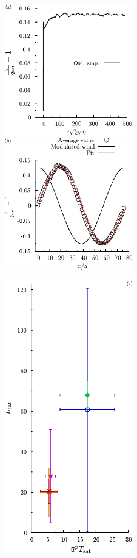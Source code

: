 \begin{figure}
    \centering
    \parbox{0.495\textwidth}{
        \centering
        \includegraphics[width=0.495\textwidth]{04-figuras/TMa-qamp.pdf}
        \includegraphics[width=0.495\textwidth]{04-figuras/TMb-qwind.pdf}
    }
    \parbox{0.495\textwidth}{
        \includegraphics[width=0.495\textwidth]{04-figuras/TMc-Lsat.pdf}
}
\end{figure}
